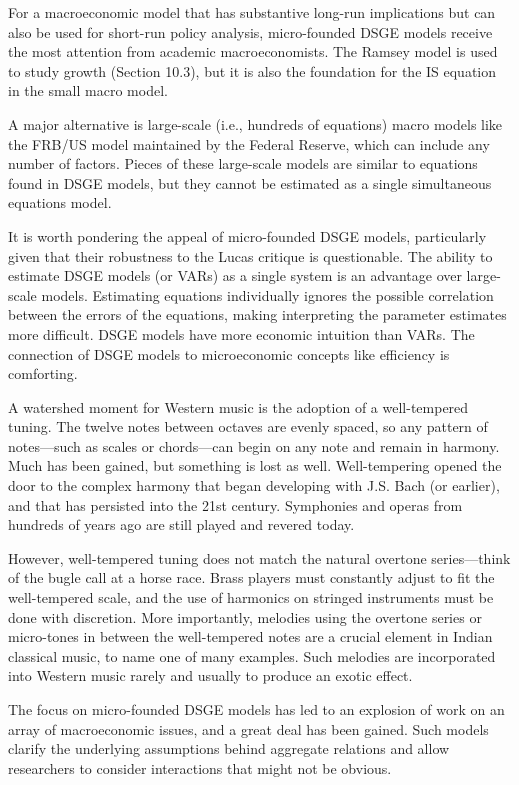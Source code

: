 ﻿\documentclass[oneside]{book}
\begin{document}
For a macroeconomic model that has substantive long-run implications but can
also be used for short-run policy analysis, micro-founded DSGE models receive
the most attention from academic macroeconomists. The Ramsey model is used
to study growth (Section 10.3), but it is also the foundation for the IS equation in
the small macro model.

A major alternative is large-scale (i.e., hundreds of equations) macro models like
the FRB/US model maintained by the Federal Reserve, which can include any number of factors. Pieces of these large-scale models are similar to equations found in DSGE models, but they cannot be estimated as a single simultaneous equations model.

It is worth pondering the appeal of micro-founded DSGE models, particularly
given that their robustness to the Lucas critique is questionable. The ability
to estimate DSGE models (or VARs) as a single system is an advantage over
large-scale models. Estimating equations individually ignores the
possible correlation between the errors of the equations, making
interpreting the parameter estimates more difficult. DSGE models have
more economic intuition than VARs. The connection of  DSGE models to
microeconomic concepts like efficiency is comforting.



A watershed moment for Western music is the adoption of a well-tempered tuning. The twelve notes between octaves are evenly spaced, so any pattern of notes---such as scales or chords---can begin on any note and remain in harmony. Much has been gained, but something is lost as well.
Well-tempering opened the door to the complex harmony that began developing
with J.S. Bach (or earlier), and that has persisted into the 21st century. Symphonies and operas from hundreds of years ago are still played and revered today.

However, well-tempered tuning does not match the natural overtone series---think
of the bugle call at a horse race. Brass players must constantly adjust to
fit the well-tempered scale, and the use of harmonics on stringed
instruments must be done with discretion. More importantly, melodies using
the overtone series or micro-tones in between the well-tempered notes are a
crucial element in Indian classical music, to name one of many examples. Such melodies are incorporated into Western music rarely and usually to
produce an exotic effect.

The focus on micro-founded DSGE models has led to an explosion of work on an array of macroeconomic issues, and a great deal has been gained. Such models clarify the underlying assumptions behind aggregate relations
and allow researchers to consider interactions that might not be obvious.
\end{document}
